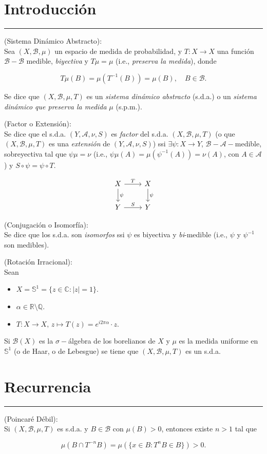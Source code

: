 
\section{Introducción}
\hrule

\mydef (Sistema Dinámico Abstracto):\\
Sea \((X,\mathcal{B},\mu)\) un espacio de medida de probabilidad, y 
\(T: X \rightarrow X\) una función \(\mathcal{B}-\mathcal{B}\) medible, 
\textit{biyectiva} y \(T\mu = \mu\) (i.e., \textit{preserva la medida}), donde

\[
T\mu (B) = \mu (T^{-1}(B)) = \mu (B), \quad B \in \mathcal{B}.
\]

Se dice que \((X,\mathcal{B},\mu,T)\) es un \textit{sistema dinámico abstracto} (s.d.a.) 
o un \textit{sistema dinámico que preserva la medida} \(\mu\) (s.p.m.).

\mydef (Factor o Extensión):\\
Se dice que el s.d.a. \((Y,\mathcal{A},\nu,S)\) es \textit{factor} del s.d.a. 
\((X,\mathcal{B},\mu,T)\) (o que \((X,\mathcal{B},\mu,T)\) es una \textit{extensión} de 
\((Y,\mathcal{A},\nu,S)\)) ssi \(\exists \psi : X \rightarrow Y\), 
\(\mathcal{B}-\mathcal{A}-\)medible, sobreyectiva tal que \(\psi \mu = \nu\) (i.e., 
\(\psi\mu(A) = \mu(\psi^{-1}(A))=\nu(A)\), con \(A \in \mathcal{A}\)) y 
\(S \circ \psi = \psi \circ T\).

\[
\begin{tikzcd}
X \arrow[r, "T"] \arrow[d, "\psi"] & X \arrow[d, "\psi"] \\
Y \arrow[r, "S"]                   & Y
\end{tikzcd}
\]

\mydef (Conjugación o Isomorfía):\\
Se dice que los s.d.a. son \textit{isomorfos} ssi \(\psi\) es biyectiva y 
\textit{bi}-medible (i.e., \(\psi\) y \(\psi^{-1}\) son medibles).

\myex (Rotación Irracional):\\
Sean
\begin{itemize}
    \item \(X = \mathbb{S}^1 = \{z \in \mathbb{C}: |z|=1\}\).
    \item \(\alpha \in \mathbb{R}\setminus\mathbb{Q}\).
    \item \(T:X \rightarrow X,\,z \mapsto T(z) = e^{i2\pi\alpha}\cdot z\).
\end{itemize}

Si \(\mathcal{B}(X)\) es la \(\sigma-\)álgebra de los borelianos de \(X\) y \(\mu\)
es la medida uniforme en \(\mathbb{S}^1\) (o de Haar, o de Lebesgue) se tiene que 
\((X,\mathcal{B},\mu,T)\) es un s.d.a.

\section{Recurrencia}
\hrule

\myteo (Poincaré Débil):\\
Si \((X,\mathcal{B},\mu,T)\) es s.d.a. y \(B \in \mathcal{B}\) con \(\mu(B)>0\),
entonces existe \(n>1\) tal que 

\[
\mu(B \cap T^{-n}B) = \mu(\{x \in B: T^nB \in B\})>0.
\]